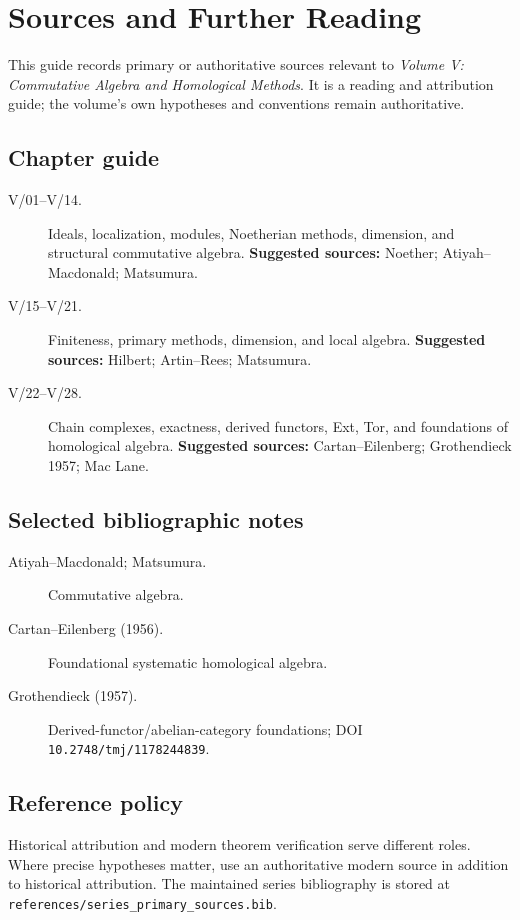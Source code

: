 \chapter*{Sources and Further Reading}
{}

This guide records primary or authoritative sources relevant to \emph{Volume V: Commutative Algebra and Homological Methods}.
It is a reading and attribution guide; the volume's own hypotheses and conventions remain authoritative.

\section*{Chapter guide}
\begin{description}
\item[V/01--V/14.] Ideals, localization, modules, Noetherian methods, dimension, and structural commutative algebra.
\textbf{Suggested sources:} Noether; Atiyah--Macdonald; Matsumura.

\item[V/15--V/21.] Finiteness, primary methods, dimension, and local algebra.
\textbf{Suggested sources:} Hilbert; Artin--Rees; Matsumura.

\item[V/22--V/28.] Chain complexes, exactness, derived functors, Ext, Tor, and foundations of homological algebra.
\textbf{Suggested sources:} Cartan--Eilenberg; Grothendieck 1957; Mac Lane.

\end{description}

\section*{Selected bibliographic notes}
\begin{description}
\item[Atiyah--Macdonald; Matsumura.] Commutative algebra.

\item[Cartan--Eilenberg (1956).] Foundational systematic homological algebra.

\item[Grothendieck (1957).] Derived-functor/abelian-category foundations; DOI \texttt{10.2748/tmj/1178244839}.

\end{description}

\section*{Reference policy}
Historical attribution and modern theorem verification serve different roles.
Where precise hypotheses matter, use an authoritative modern source in addition to historical attribution.
The maintained series bibliography is stored at \texttt{references/series\_primary\_sources.bib}.
